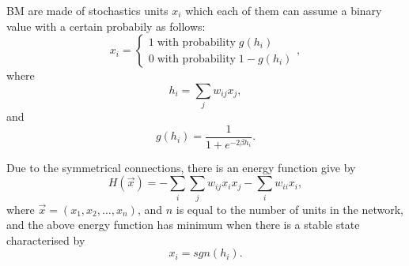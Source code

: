 BM are made of stochastics units $x_{i}$ which each of them can assume a binary value with a certain probabily as follows:
\begin{equation}
  x_{i} =
    \begin{cases}
      1 \; \text{with probability} \; g(h_{i}) \\
      0 \; \text{with probability} \; 1 - g(h_{i})
    \end{cases},
  \label{eq:eq1}
\end{equation}
where
\begin{equation}
  h_{i} = \sum_{j}w_{ij}x_{j},
  \label{eq:eq2}
\end{equation}
and
\begin{equation}
  g(h_{i}) = \frac{1}{1 + e^{-2 \beta h_{i}}}.
  \label{eq:eq3}
\end{equation}

Due to the symmetrical connections, there is an energy function give by
\begin{equation}
  H(\vec{x}) = - \sum_{i} \sum_{j} w_{ij}x_{i}x_{j} - \sum_{i} w_{ii}x_{i},
  \label{eq:eq4}
\end{equation}
where $\vec{x} = (x_{1}, x_{2}, \dots, x_{n})$, and $n$ is equal to the number of units in the network, and the above energy function has minimum when there is a stable state characterised by
\begin{equation}
  x_{i} = sgn(h_{i}).
  \label{eq:eq5}
\end{equation}
